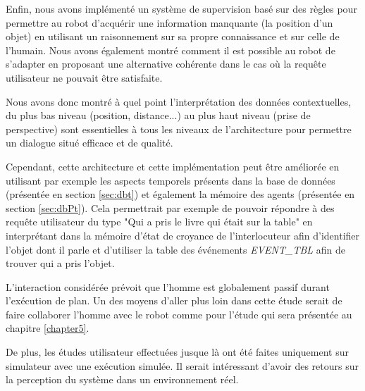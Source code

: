 \documentclass[a4paper,11pt,twoside]{StyleThese}
\begin{document}
Enfin, nous avons implémenté un système de supervision basé sur des règles pour permettre au robot d'acquérir une information manquante (la position d'un objet) en utilisant un raisonnement sur sa propre connaissance et sur celle de l'humain.
Nous avons également montré comment il est possible au robot de s'adapter en proposant une alternative cohérente dans le cas où la requête utilisateur ne pouvait être satisfaite.


Nous avons donc montré à quel point l'interprétation des données contextuelles, du plus bas niveau (position, distance...) au plus haut niveau (prise de perspective) sont essentielles à tous les niveaux de l'architecture pour permettre un dialogue situé efficace et de qualité.

Cependant, cette architecture et cette implémentation peut être améliorée en utilisant par exemple les aspects temporels présents dans la base de données (présentée en section \ref{sec:dbt}) et également la mémoire des agents (présentée en section \ref{sec:dbPt}). Cela permettrait par exemple de pouvoir répondre à des requête utilisateur du type "Qui a pris le livre qui était sur la table" en interprétant dans la mémoire d'état de croyance de l'interlocuteur afin d'identifier l'objet dont il parle et d'utiliser la table des événements  \textit{EVENT\_TBL} afin de trouver qui a pris l'objet.

L'interaction considérée prévoit que l'homme est globalement passif durant l'exécution de plan. Un des moyens d'aller plus loin dans cette étude serait de faire collaborer l'homme avec le robot comme pour l'étude qui sera présentée au chapitre \ref{chapter5}.

De plus, les études utilisateur effectuées jusque là ont été faites uniquement sur simulateur avec une exécution simulée. Il serait intéressant d'avoir des retours sur la perception du système dans un environnement réel. 


\end{document}
